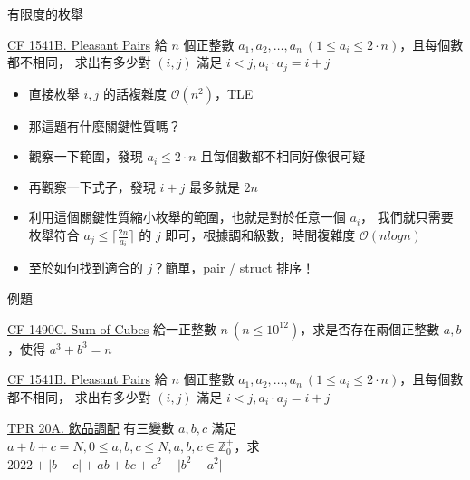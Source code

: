 \documentclass[aspectratio=169]{beamer}
\begin{document}
    \begin{frame}{有限度的枚舉}
        \begin{block}{\href{https://codeforces.com/problemset/problem/1541/B}{CF 1541B. Pleasant Pairs}}
            給 $n$ 個正整數 $a_1, a_2, \dots, a_n\ (1 \le a_i \le 2 \cdot n)$，且每個數都不相同，
            求出有多少對 $(i, j)$ 滿足 $i < j, a_i \cdot a_j = i + j$
        \end{block}

        \begin{itemize}
            \item<1-> 直接枚舉 $i, j$ 的話複雜度 $\mathcal{O}(n^2)$，TLE
            \item<2-> 那這題有什麼關鍵性質嗎？
            \item<3-> 觀察一下範圍，發現 $a_i \le 2 \cdot n$ 且每個數都不相同好像很可疑
            \item<4-> 再觀察一下式子，發現 $i + j$ 最多就是 $2n$
            \item<5-> 利用這個關鍵性質縮小枚舉的範圍，也就是對於任意一個 $a_i$，
            我們就只需要枚舉符合 $a_j \le \lceil \frac{2n}{a_i} \rceil$ 的 $j$ 即可，根據調和級數，時間複雜度 $\mathcal{O}(nlogn)$
            \item<6-> 至於如何找到適合的 $j$？簡單，pair / struct 排序！
        \end{itemize}
    \end{frame}

    \begin{frame}{例題}
        \begin{block}{\href{https://codeforces.com/problemset/problem/1490/C}{CF 1490C. Sum of Cubes}}
            給一正整數 $n\ (n \le 10^{12})$，求是否存在兩個正整數 $a, b$，使得 $a^3 + b^3 = n$
        \end{block}

        \begin{block}{\href{https://codeforces.com/problemset/problem/1541/B}{CF 1541B. Pleasant Pairs}}
            給 $n$ 個正整數 $a_1, a_2, \dots, a_n\ (1 \le a_i \le 2 \cdot n)$，且每個數都不相同，
            求出有多少對 $(i, j)$ 滿足 $i < j, a_i \cdot a_j = i + j$
        \end{block}

        \begin{block}{\href{https://codeforces.com/group/H0qY3QmnOW/contest/377732/problem/A}{TPR 20A. 飲品調配}}
            有三變數 $a, b, c$ 滿足 $a + b + c = N, 0 \le a, b, c \le N, a, b, c \in \mathbb{Z}^+_0$，求 $2022 + \lvert b - c \rvert + ab + bc + c^2 - \lvert b^2 - a^2 \rvert$
        \end{block}
    \end{frame}
\end{document}
